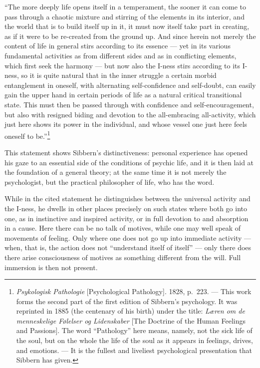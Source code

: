 \documentclass[12pt,a4paper]{book}
\newcommand{\opage}[1]{\marginnote{\footnotesize\textit{[#1]}}}
\begin{document}
``The more deeply life opens itself in a temperament, the sooner it can come to pass through
a chaotic mixture and stirring of the elements in its interior, and the world that is to
build itself up in it, it must now itself take part in creating, as if it were to be
re-created from the ground up. And since herein not merely the content of life in general
stirs according to its essence --- yet in its various fundamental activities as from
different sides and as in conflicting elements, which first seek the harmony --- but now
also the I-ness stirs according to its I-ness, so it is quite natural that in the inner
struggle a certain morbid entanglement in oneself, with alternating self-confidence and
self-doubt, can easily gain the upper hand in certain periods of life as a natural critical
transitional state. This must then be passed through with confidence and self-encouragement,
but also with resigned biding and devotion to the all-embracing all-activity, which just
here shows its power in the individual, and whose vessel one just here feels oneself to
be.''\footnote{\emph{Psykologisk Pathologie} [Psychological Pathology]. 1828, p.~223. ---
This work forms the second part of the first edition of Sibbern's psychology. It was
reprinted in 1885 (the centenary of his birth) under the title: \emph{Læren om de
menneskelige Følelser og Lidenskaber} [The Doctrine of the Human Feelings and Passions]. The
word ``Pathology'' here means, namely, not the sick life of the soul, but on the whole the
life of the soul as it appears in feelings, drives, and emotions. --- It is the fullest and
liveliest psychological presentation that Sibbern has given.}

This statement shows Sibbern's distinctiveness: personal experience has opened his gaze to
an essential side of the conditions of psychic life, and it is then laid at the foundation
of a general theory; at the same time it is not merely the psychologist, but the practical
philosopher of life, who has the word.

\opage{102}While in the cited statement he distinguishes between the universal activity and the
I-ness, he dwells in other places precisely on such states where both go into one, as in
instinctive and inspired activity, or in full devotion to and absorption in a cause. Here
there can be no talk of motives, while one may well speak of movements of feeling. Only
where one does not go up into immediate activity --- when, that is, the action does not
``understand itself of itself'' --- only there does there arise consciousness of motives as
something different from the will. Full immersion is then not present.
\end{document}
